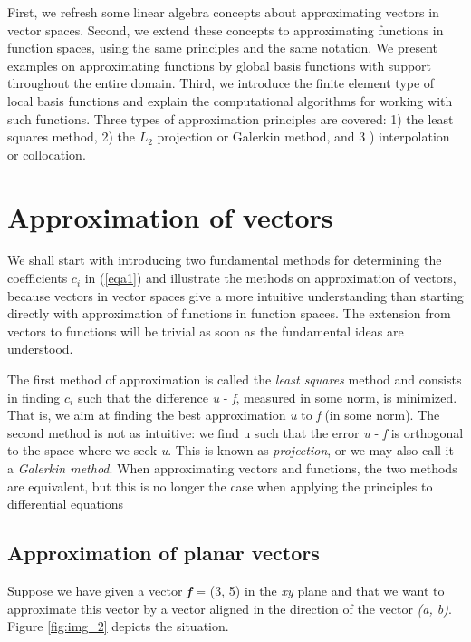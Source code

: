 \documentclass[../main.tex]{subfiles}
\begin{document}
First, we refresh some linear algebra concepts about approximating vectors in vector spaces. Second, we extend these concepts to approximating functions in function spaces, using the same principles and the same notation. We present examples on approximating functions by global basis functions with support throughout the entire domain. Third, we introduce the finite element type of local basis functions and explain the computational algorithms for working with such functions. Three types of approximation principles are covered: 1) the least squares method, 2) the $L_{2}$ projection or Galerkin method, and 3 ) interpolation or collocation.
\chapter{Approximation of vectors}
\label{chap:chap_1}
\setcounter{page}{1}
\noindent We shall start with introducing two fundamental methods for determining the
coefficients $c_{i}$
in (\ref{eqa1}) and illustrate the methods on approximation of vectors,
because vectors in vector spaces give a more intuitive understanding than starting
directly with approximation of functions in function spaces. The extension
from vectors to functions will be trivial as soon as the fundamental ideas are
understood.

The first method of approximation is called the \textit{least squares} method and
consists in finding $c_{i}$ such that the difference \textit{u} - \textit{f}, measured in some norm, is
minimized. That is, we aim at finding the best approximation \textit{u} to \textit{f} (in some
norm). The second method is not as intuitive: we find u such that the error
\textit{u} - \textit{f} is orthogonal to the space where we seek \textit{u}. This is known as \textit{projection},
or we may also call it a \textit{Galerkin method}. When approximating vectors and
functions, the two methods are equivalent, but this is no longer the case when
applying the principles to differential equations

\section[Approximation of planar vectors]{ Approximation of planar vectors}
\label{sec:sec_1_1}
\noindent Suppose we have given a vector \textit{\textbf{f}} = (3, 5) in the \textit{xy} plane and that we want to
approximate this vector by a vector aligned in the direction of the vector \textit{(a, b)}.
Figure \ref{fig:img_2} depicts the situation.
\end{document}
